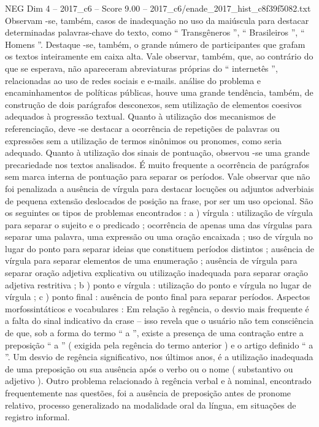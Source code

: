\begin{textsample}{NEG Dim 4 – 2017\_c6 – Score 9.00 – 2017\_c6/enade\_2017\_hist\_c8f39f5082.txt}
Observam -se, também, casos de inadequação no uso da maiúscula para destacar determinadas palavras-chave do texto, como “ Transgêneros ”, “ Brasileiros ”, “ Homens ”.
Destaque -se, também, o grande número de participantes que grafam os textos inteiramente em caixa alta.
Vale observar, também, que, ao contrário do que se esperava, não apareceram abreviaturas próprias do “ internetês ”, relacionadas ao uso de redes sociais e e-mails. análise do problema e encaminhamentos de políticas públicas, houve uma grande tendência, também, de construção de dois parágrafos desconexos, sem utilização de elementos coesivos adequados à progressão textual.
Quanto à utilização dos mecanismos de referenciação, deve -se destacar a ocorrência de repetições de palavras ou expressões sem a utilização de termos sinônimos ou pronomes, como seria adequado.
Quanto à utilização dos sinais de pontuação, observou -se uma grande precariedade nos textos analisados.
É muito frequente a ocorrência de parágrafos sem marca interna de pontuação para separar os períodos.
Vale observar que não foi penalizada a ausência de vírgula para destacar locuções ou adjuntos adverbiais de pequena extensão deslocados de posição na frase, por ser um uso opcional.
São os seguintes os tipos de problemas encontrados : a ) vírgula : utilização de vírgula para separar o sujeito e o predicado ; ocorrência de apenas uma das vírgulas para separar uma palavra, uma expressão ou uma oração encaixada ; uso de vírgula no lugar do ponto para separar ideias que constituem períodos distintos ; ausência de vírgula para separar elementos de uma enumeração ; ausência de vírgula para separar oração adjetiva explicativa ou utilização inadequada para separar oração adjetiva restritiva ; b ) ponto e vírgula : utilização do ponto e vírgula no lugar de vírgula ; c ) ponto final : ausência de ponto final para separar períodos.
Aspectos morfossintáticos e vocabulares : Em relação à regência, o desvio mais frequente é a falta do sinal indicativo da crase – isso revela que o usuário não tem consciência de que, sob a forma do termo “ a ”, existe a presença de uma contração entre a preposição “ a ” ( exigida pela regência do termo anterior ) e o artigo definido “ a ”.
Um desvio de regência significativo, nos últimos anos, é a utilização inadequada de uma preposição ou sua ausência após o verbo ou o nome ( substantivo ou adjetivo ).
Outro problema relacionado à regência verbal e à nominal, encontrado frequentemente nas questões, foi a ausência de preposição antes de pronome relativo, processo generalizado na modalidade oral da língua, em situações de registro informal.

\end{textsample}
